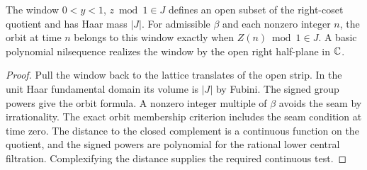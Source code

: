 \begin{lemma}\label{checked-heisenberg-window}
\leanok
The window $0<y<1$, $z\bmod 1\in J$ defines an open subset of the
right-coset quotient and has Haar mass $|J|$. For admissible $\beta$
and each nonzero integer $n$, the orbit at time $n$ belongs to this
window exactly when $Z(n)\bmod 1\in J$. A basic polynomial nilsequence
realizes the window by the open right half-plane in $\mathbb C$.
\end{lemma}
\begin{proof}
\leanok
Pull the window back to the lattice translates of the open strip.
In the unit Haar fundamental domain its volume is $|J|$ by Fubini.
The signed group powers give the orbit formula. A nonzero integer
multiple of $\beta$ avoids the seam by irrationality. The exact
orbit membership criterion includes the seam condition at time zero.
The distance to the closed complement is a continuous function on
the quotient, and the signed powers are polynomial for the rational
lower central filtration. Complexifying the distance supplies the
required continuous test.
\end{proof}


